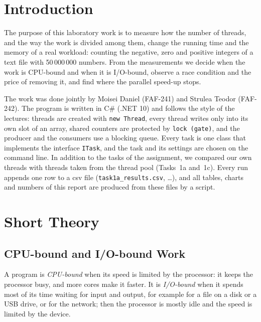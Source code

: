 \documentclass[12pt,a4paper]{article}
\begin{document}
\setcounter{page}{2}
\tableofcontents
\newpage

\section*{Introduction}

The purpose of this laboratory work is to measure how the number of threads, and the way the work is divided among them, change the running time and the memory of a real workload: counting the negative, zero and positive integers of a text file with 50\,000\,000 numbers. From the measurements we decide when the work is CPU-bound and when it is I/O-bound, observe a race condition and the price of removing it, and find where the parallel speed-up stops.

The work was done jointly by Moisei Daniel (FAF-241) and Strulea Teodor (FAF-242). The program is written in C\# (.NET 10) and follows the style of the lectures: threads are created with \texttt{new Thread}, every thread writes only into its own slot of an array, shared counters are protected by \texttt{lock (gate)}, and the producer and the consumers use a blocking queue. Every task is one class that implements the interface \texttt{ITask}, and the task and its settings are chosen on the command line. In addition to the tasks of the assignment, we compared our own threads with threads taken from the thread pool (Tasks~1a and~1c). Every run appends one row to a csv file (\texttt{task1a\_results.csv}, \dots), and all tables, charts and numbers of this report are produced from these files by a script.

\newpage
\section{Short Theory}

\subsection{CPU-bound and I/O-bound Work}

A program is \textit{CPU-bound} when its speed is limited by the processor: it keeps the processor busy, and more cores make it faster. It is \textit{I/O-bound} when it spends most of its time waiting for input and output, for example for a file on a disk or a USB drive, or for the network; then the processor is mostly idle and the speed is limited by the device.
\end{document}
